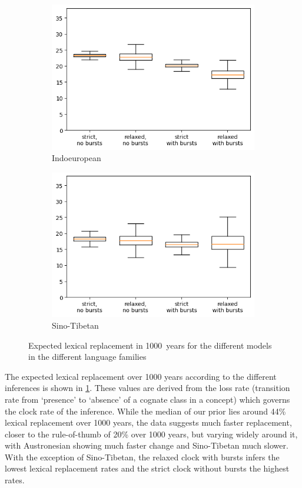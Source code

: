 \documentclass[]{rsos}%
\begin{document}
\begin{figure}
\begin{subfigure}{0.4\textwidth}
    \includegraphics[width=\textwidth]{supplement/analysis/indoeuropean_replacement.png}
    \caption{Indoeuropean}
  \end{subfigure}
  \begin{subfigure}{0.4\textwidth}
    \includegraphics[width=\textwidth]{supplement/analysis/sinotibetan_replacement.png}
    \caption{Sino-Tibetan}
  \end{subfigure}
  \caption{Expected lexical replacement in 1000~years for the different models
    in the different language families}\label{f:clock}
\end{figure}

The expected lexical replacement over 1000 years according to the different
inferences is shown in \cref{f:clock}. These values are derived from the loss
rate (transition rate from ‘presence’ to ‘absence’ of a cognate class in a
concept) which governs the clock rate of the inference. While the median of our
prior lies around 44\% lexical replacement over 1000 years, the data suggests
much faster replacement, closer to the \textcite{swadesh1955greater}
rule-of-thumb of 20\% over 1000 years, but varying widely around it, with
Austronesian showing much faster change and Sino-Tibetan much slower. With the
exception of Sino-Tibetan, the relaxed clock with bursts infers the lowest
lexical replacement rates and the strict clock without bursts the highest rates.
\end{document}
